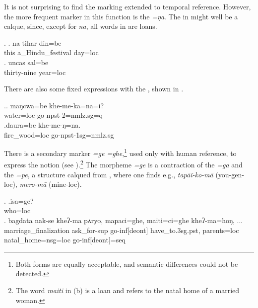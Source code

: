 It is not surprising to find the  marking extended to temporal reference. However, the more frequent marker in this function is the  \emph{=ŋa}. The  in \Next might well be a  calque, since, except for \emph{na}, all words in \Next are  loans. 

\ex. \ag. na tihar din=be\\
		this a\_Hindu\_festival day{\sc =loc}	\\
	 
 	\bg. uncas sal=be\\
	thirty-nine year{\sc =loc}		\\
	 

	There are also some fixed expressions with the , shown in \Next.
	
	\ex.\ag. maŋcwa=be  khe-me-ka=na=i?\\
	water{\sc =loc} go{\sc -npst-2=nmlz.sg=q}\\
	 	
	\bg.daura=be khe-me-ŋ=na.\\
	fire\_wood{\sc =loc} go{\sc -npst-1sg=nmlz.sg}\\
	
There is a secondary  marker \emph{=ge \ti =ghe},\footnote{Both forms are equally acceptable, and semantic differences could not be detected.} used only with human reference, to express the notion  (see \Next).\footnote{The word \emph{maiti} in (b) is a  loan and refers to the natal home of a married woman.} The morpheme \emph{=ge} is a contraction of the  \emph{=ga} and the  \emph{=pe}, a structure calqued from , where one finds e.g.,  \emph{tapāĩ-ko-mā}  (you-{\sc gen-loc}), \emph{mero-mā}  (mine-{\sc loc}). 

\ex. \ag.isa=ge?\\
		who{\sc =loc}\\
 	\bg. bagdata nak-se      kheʔ-ma   pʌryo,  mapaci=ghe,      maiti=ci=ghe   kheʔ-ma=hoŋ, ...\\
		marriage\_finalization ask\_for{\sc -sup} go{\sc -inf[deont]} have\_to{\sc .3sg.pst},  parents{\sc =loc} natal\_home{\sc =nsg=loc} go{\sc -inf[deont]=seq} \\
	
